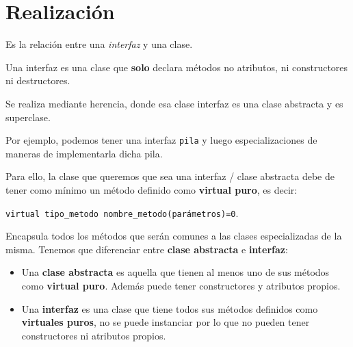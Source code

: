 \newpage
\section{Realización}
Es la relación entre una \textit{interfaz} y una clase.

Una interfaz es una clase que \textbf{solo} declara métodos no atributos, ni constructores ni destructores.

Se realiza mediante herencia, donde esa clase interfaz es una clase abstracta y es superclase.

Por ejemplo, podemos tener una interfaz \texttt{pila} y luego especializaciones de maneras de implementarla dicha pila.

Para ello, la clase que queremos que sea una interfaz / clase abstracta debe de tener como mínimo un método definido como \textbf{virtual puro}, es decir:
\begin{center}
	\texttt{virtual tipo\_metodo nombre\_metodo(parámetros)=0}. 

\end{center} 
Encapsula todos los métodos que serán comunes a las clases especializadas de la misma.
Tenemos que diferenciar entre \textbf{clase abstracta} e \textbf{interfaz}:
\begin{itemize}
	\item Una \textbf{clase abstracta} es aquella que tienen al menos uno de sus métodos como \textbf{virtual puro}. Además puede tener constructores y atributos propios.
	\item Una \textbf{interfaz} es una clase que tiene todos sus métodos definidos como \textbf{virtuales puros}, no se puede instanciar por lo que no pueden tener constructores ni atributos propios.
\end{itemize}